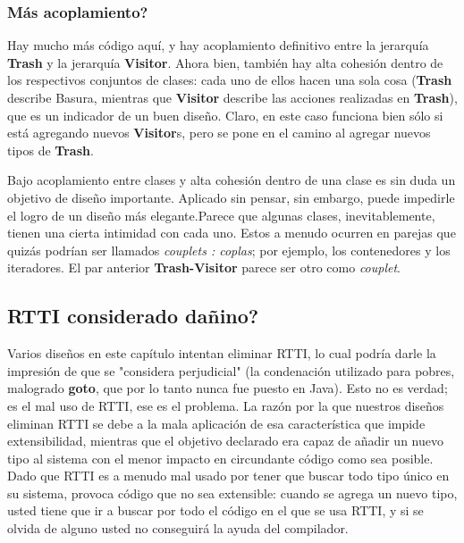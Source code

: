 \documentclass{article}
\begin{document}
\subsubsection{Más acoplamiento?}

Hay mucho más código aquí, y hay acoplamiento definitivo entre la jerarquía \textbf{Trash} y la jerarquía \textbf{Visitor}. Ahora bien, también hay alta cohesión dentro de los respectivos conjuntos de clases: cada uno de ellos hacen una sola cosa (\textbf{Trash} describe Basura, mientras que \textbf{Visitor} describe las acciones realizadas en \textbf{Trash}), que es un indicador de un buen diseño. Claro, en este caso funciona bien sólo si está agregando nuevos \textbf{Visitor}s, pero se pone en el camino al agregar nuevos tipos de \textbf{Trash}.          \newline

Bajo acoplamiento entre clases y alta cohesión dentro de una clase es sin duda un objetivo de diseño importante. Aplicado sin pensar, sin embargo, puede impedirle el logro de un diseño más elegante.Parece que algunas clases, inevitablemente, tienen una cierta intimidad con cada uno. Estos a menudo ocurren en parejas que quizás podrían ser llamados \textit{couplets : coplas}; por ejemplo, los contenedores y los iteradores. El par anterior \textbf{Trash-Visitor} parece ser otro como \textit{couplet}.    \newline

\subsection{RTTI considerado dañino?}

Varios diseños en este capítulo intentan eliminar RTTI, lo cual podría darle la impresión de que se "considera perjudicial" (la condenación utilizado para pobres, malogrado \textbf{goto}, que por lo tanto nunca fue puesto en Java). Esto no es verdad; es el mal uso de RTTI, ese es el problema. La razón por la que nuestros diseños eliminan RTTI se debe a la mala aplicación de esa característica que impide extensibilidad, mientras que el objetivo declarado era capaz de añadir un nuevo tipo al sistema con el menor impacto en circundante código como sea posible. Dado que RTTI es a menudo mal usado por tener que buscar todo tipo único en su sistema, provoca código que no sea extensible: cuando se agrega un nuevo tipo, usted tiene que ir a buscar por todo el código en el que se usa RTTI, y si se olvida de alguno usted no conseguirá la ayuda del compilador.     \newline
\end{document}
